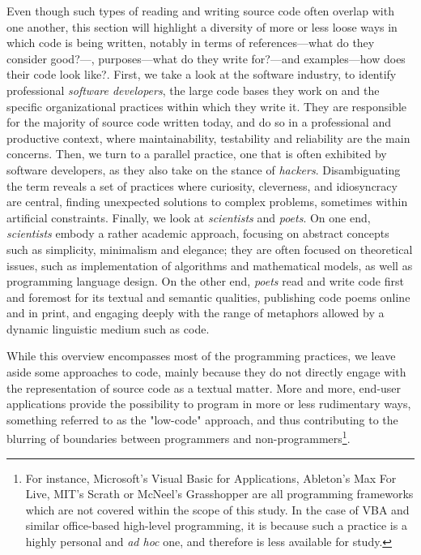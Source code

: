 Even though such types of reading and writing source code often overlap with one another, this section will highlight a diversity of more or less loose ways in which code is being written, notably in terms of references—what do they consider good?—, purposes—what do they write for?—and examples—how does their code look like?. First, we take a look at the software industry, to identify professional \emph{software developers}, the large code bases they work on and the specific organizational practices within which they write it. They are responsible for the majority of source code written today, and do so in a professional and productive context, where maintainability, testability and reliability are the main concerns. Then, we turn to a parallel practice, one that is often exhibited by software developers, as they also take on the stance of \emph{hackers}. Disambiguating the term reveals a set of practices where curiosity, cleverness, and idiosyncracy are central, finding unexpected solutions to complex problems, sometimes within artificial constraints. Finally, we look at \emph{scientists} and \emph{poets}. On one end, \emph{scientists} embody a rather academic approach,  focusing on abstract concepts such as simplicity, minimalism and elegance; they are often focused on theoretical issues, such as implementation of algorithms and mathematical models, as well as programming language design. On the other end, \emph{poets} read and write code first and foremost for its textual and semantic qualities, publishing code poems online and in print, and engaging deeply with the range of metaphors allowed by a dynamic linguistic medium such as code.

While this overview encompasses most of the programming practices, we leave aside some approaches to code, mainly because they do not directly engage with the representation of source code as a textual matter. More and more, end-user applications provide the possibility to program in more or less rudimentary ways, something referred to as the "low-code" approach\cite{team_lowcode_2021}, and thus contributing to the blurring of boundaries between programmers and non-programmers\footnote{For instance, Microsoft's Visual Basic for Applications, Ableton's Max For Live, MIT's Scrath or McNeel's Grasshopper are all programming frameworks which are not covered within the scope of this study. In the case of VBA and similar office-based high-level programming, it is because such a practice is a highly personal and \emph{ad hoc} one, and therefore is less available for study.}.

